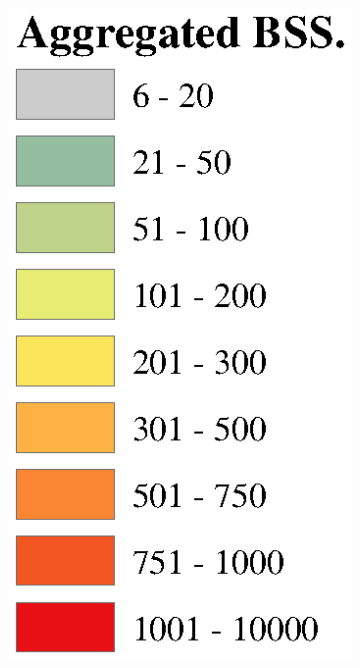 \documentclass[preprints,ijgi,submit,moreauthors]{Definitions/mdpi}
\begin{document}
\begin{figure}[ht]
\begin{subfigure}{.14\textwidth}
        \includegraphics[width=\textwidth]{Figures/Overall_spatial_patterns/legend5.eps}
    \end{subfigure}
    

\end{figure}
\end{document}
